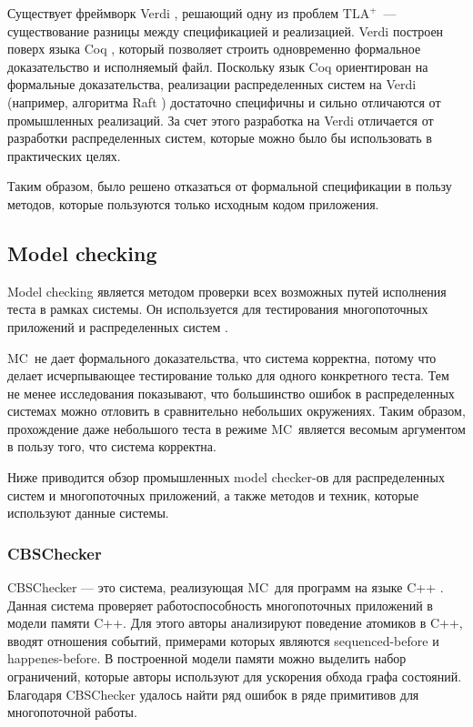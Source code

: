\documentclass[a4paper,12pt]{extarticle}
\newcommand{\mc}[0]{MC}
\begin{document}
Существует фреймворк Verdi \cite{b3}, решающий одну из проблем $\text{TLA}^+$~--- существование разницы между спецификацией и реализацией.
Verdi построен поверх языка Coq \cite{b35}, который позволяет строить одновременно формальное доказательство и исполняемый файл.
Поскольку язык Coq ориентирован на формальные доказательства, реализации распределенных систем на Verdi (например, алгоритма Raft \cite{b34}) достаточно специфичны и сильно отличаются от промышленных реализаций.
За счет этого разработка на Verdi отличается от разработки распределенных систем, которые можно было бы использовать в практических целях.

Таким образом, было решено отказаться от формальной спецификации в пользу методов, которые пользуются только исходным кодом приложения.

\subsection{Model checking}

Model checking является методом проверки всех возможных путей исполнения теста в рамках системы.
Он используется для тестирования многопоточных приложений и распределенных систем \cite{b23,b22}.

\mc\ не дает формального доказательства, что система корректна, потому что делает исчерпывающее тестирование только для одного конкретного теста.
Тем не менее исследования \cite{b9} показывают, что большинство ошибок в распределенных системах можно отловить в сравнительно небольших окружениях.
Таким образом, прохождение даже небольшого теста в режиме  \mc\ является весомым аргументом в пользу того, что система корректна.

Ниже приводится обзор промышленных model checker-ов для распределенных систем и многопоточных приложений, а также методов и техник, которые используют данные системы.

\subsubsection{CBSChecker}

CBSChecker --- это система, реализующая \mc\ для программ на языке C++ \cite{b5}.
Данная система проверяет работоспособность многопоточных приложений в модели памяти C++.
Для этого авторы анализируют поведение атомиков в C++, вводят отношения событий, примерами которых являются sequenced-before и happenes-before.
В построенной модели памяти можно выделить набор ограничений, которые авторы используют для ускорения обхода графа состояний.
Благодаря CBSChecker удалось найти ряд ошибок в ряде примитивов для многопоточной работы.
\end{document}
